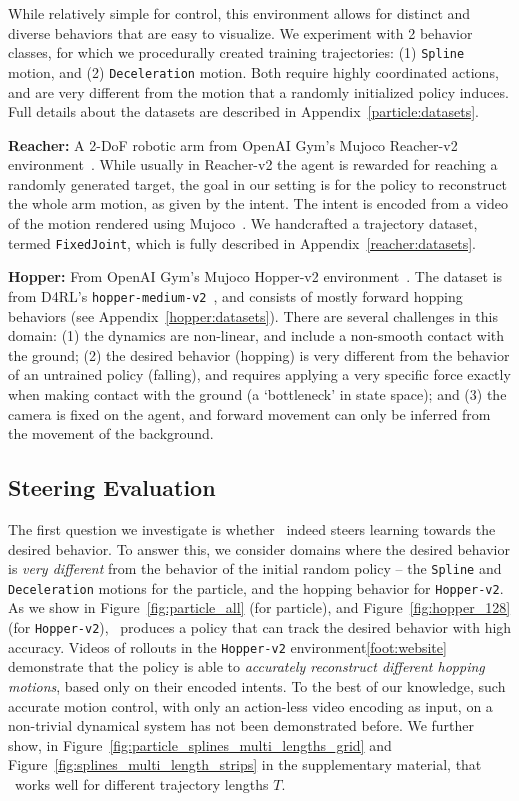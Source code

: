 \documentclass[nohyperref]{article}
\begin{document}
While relatively simple for control, this environment allows for distinct and diverse behaviors that are easy to visualize. We experiment with 2 behavior classes, for which we procedurally created training trajectories: (1) \texttt{Spline} motion, and (2) \texttt{Deceleration} motion. Both require highly coordinated actions, and are very different from the motion that a randomly initialized policy induces. Full details about the datasets are described in Appendix~\ref{particle:datasets}. 

\textbf{Reacher:}
A 2-DoF robotic arm from OpenAI Gym's Mujoco Reacher-v2 environment~\citep{1606.01540}. While usually in Reacher-v2 the agent is rewarded for reaching a randomly generated target, the goal in our setting is for the policy to reconstruct the whole arm motion, as given by the intent. The intent is encoded from a video of the motion rendered using Mujoco~\citep{todorov2012mujoco}. We handcrafted a trajectory dataset, termed \texttt{FixedJoint}, which is fully described in Appendix~\ref{reacher:datasets}. 


\textbf{Hopper:}
From OpenAI Gym's Mujoco Hopper-v2 environment~\citep{1606.01540}. The dataset is from D4RL's \texttt{hopper-medium-v2}~\citep{fu2020d4rl}, and consists of mostly forward hopping behaviors (see Appendix~\ref{hopper:datasets}). There are several challenges in this domain: (1) the dynamics are non-linear, and include a non-smooth contact with the ground; (2) the desired behavior (hopping) is very different from the behavior of an untrained policy (falling), and requires applying a very specific force exactly when making contact with the ground (a `bottleneck' in state space); and (3) the camera is fixed on the agent, and forward movement can only be inferred from the movement of the background.


\subsection*{Steering Evaluation}
\label{ssec:steering_evaluation}

The first question we investigate is whether \methodname\ indeed steers learning towards the desired behavior. To answer this, we consider domains where the desired behavior is \textit{very different} from the behavior of the initial random policy -- the \texttt{Spline} and \texttt{Deceleration} motions for the particle, and the hopping behavior for \texttt{Hopper-v2}. As we show in Figure~\ref{fig:particle_all} (for particle), 
and Figure~\ref{fig:hopper_128} (for \texttt{Hopper-v2}), \methodname\ produces a policy that can track the desired behavior with high accuracy. Videos of rollouts in the \texttt{Hopper-v2} environment\cref{foot:website} demonstrate that the policy is able to \textit{accurately reconstruct different hopping motions}, based only on their encoded intents. To the best of our knowledge, such accurate motion control, with only an action-less video encoding as input, on a non-trivial dynamical system has not been demonstrated before.
We further show, in Figure~\ref{fig:particle_splines_multi_lengths_grid} and Figure~\ref{fig:splines_multi_length_strips} in the supplementary material, that \methodname\ works well for different trajectory lengths $T$.
\end{document}
